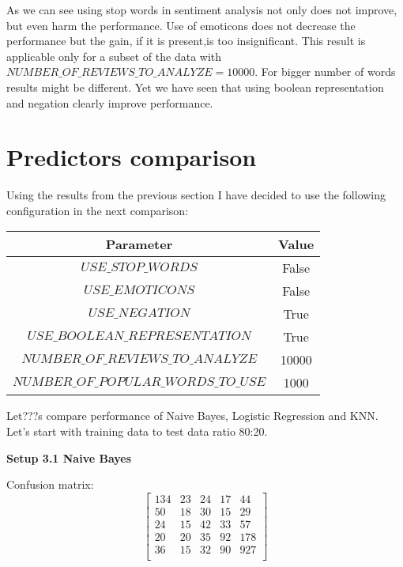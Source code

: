 \documentclass[12pt]{report}
\begin{document}
As we can see using stop words in sentiment analysis not only does not improve, but even harm the performance. Use of emoticons does not decrease the performance but the gain, if it is present,is too insignificant.
This result is applicable only for a subset of the data with $NUMBER\_OF\_REVIEWS\_TO\_ANALYZE = 10000$. For bigger number of words results might be different. Yet we have seen that using boolean representation and negation clearly improve performance.

\newpage


\section{Predictors comparison}

Using the results from the previous section I have decided to use the following configuration in the next comparison:

\begin{center}
	\begin{tabular}{ c | c }
		\hline
		Parameter & Value \\ \hline
		$USE\_STOP\_WORDS$ & False \\ \hline
		$USE\_EMOTICONS$ & False \\ \hline
		$USE\_NEGATION$ & True \\ \hline
		$USE\_BOOLEAN\_REPRESENTATION$ & True \\ \hline
		$NUMBER\_OF\_REVIEWS\_TO\_ANALYZE$ & 10000 \\ \hline
		$NUMBER\_OF\_POPULAR\_WORDS\_TO\_USE$ & 1000 \\ \hline
	\end{tabular}
\end{center}

Let???s compare performance of Naive Bayes, Logistic Regression and KNN.
Let's start with training data to test data ratio 80:20.

\bigbreak

\textbf{Setup 3.1 Naive Bayes}

Confusion matrix:
\[
\begin{bmatrix}
134 & 23 & 24 & 17 & 44 \\
50 & 18 & 30 & 15 & 29 \\
24 & 15 & 42 & 33 & 57 \\
20 & 20 & 35 & 92 & 178 \\
36 & 15 & 32 & 90 & 927 \\
\end{bmatrix}
\]
\end{document}
